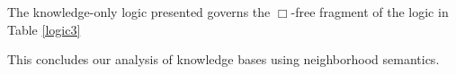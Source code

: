 \begin{proposition}
  The knowledge-only logic presented governs the $\Box$-free fragment of the
  logic in Table \ref{logic3}
\end{proposition}

This concludes our analysis of knowledge bases using neighborhood
semantics.
